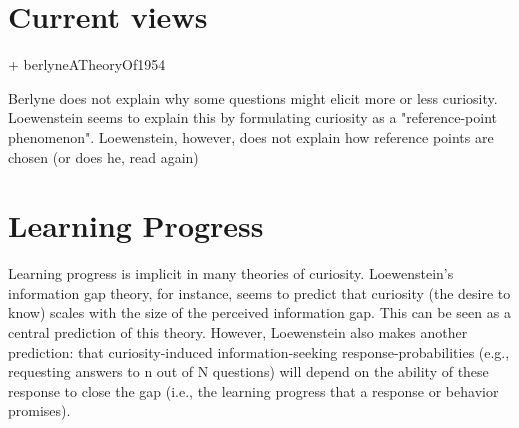 \section{Current views}
\citeauthor[]{murayamaProcessAccountCuriosity2019,bazhydaiCuriosityExploration2020,gottliebCuriosityInformationDemand2020,cerveraCuriosityPerspectiveSystems2020,renningerCambridgeHandbookMotivation2019,kiddPsychologyNeuroscienceCuriosity2015,gottliebNeuroscienceActiveSampling2018,silviaLookingCuriousPersonality2020,kashdanCuriosityInterestBenefits2009,metcalfeEpistemicCuriosityRegion2020} + berlyneATheoryOf1954

Berlyne does not explain why some questions might elicit more or less curiosity. Loewenstein seems to explain this by formulating curiosity as a "reference-point phenomenon". Loewenstein, however, does not explain how reference points are chosen (or does he, read again)

\section{Learning Progress}
Learning progress is implicit in many theories of curiosity. Loewenstein's information gap theory, for instance, seems to predict that curiosity (the desire to know) scales with the size of the perceived information gap. This can be seen as a central prediction of this theory. However, Loewenstein also makes another prediction: that curiosity-induced information-seeking response-probabilities (e.g., requesting answers to n out of N questions) will depend on the ability of these response to close the gap (i.e., the learning progress that a response or behavior promises).